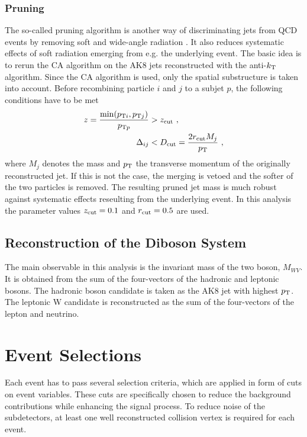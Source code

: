 \subsubsection*{Pruning}
The so-called pruning algorithm is another way of discriminating jets from QCD events by removing soft and wide-angle radiation \cite{pruning}. It also reduces systematic effects of soft radiation emerging from e.g. the underlying event. The basic idea is to rerun the CA algorithm on the AK8 jets reconstructed with the anti-$k_{\rm T}$ algorithm. Since the CA algorithm is used, only the spatial substructure is taken into account.  Before recombining particle $i$ and $j$ to a subjet $p$, the following conditions have to be met
\begin{align}
z = \frac{\min (p_{{\rm T}i},p_{{\rm T}j})}{p_{{\rm T}p}} &> z_{\rm cut} ~, \\
\Delta_{ij} &< D_{\rm cut} = \frac{2r_{\rm cut}M_j}{p_{\rm T}} ~,
\end{align}
where $M_j$ denotes the mass and $p_{\rm T}$ the transverse momentum of the originally reconstructed jet. If this is not the case, the merging is vetoed and the softer of the two particles is removed. The resulting pruned jet mass \Mpr is much robust against systematic effects reseulting from the underlying event. In this analysis the parameter values $z_{\rm cut}=0.1$ and $r_{\rm cut}=0.5$ are used.
\subsection{Reconstruction of the Diboson System}
The main observable in this analysis is the invariant mass of the two boson, $M_{WV}$. It is obtained from the sum of the four-vectors of the hadronic and leptonic bosons. The hadronic boson candidate is taken as the AK8 jet with highest $p_{\rm T}$. The leptonic W candidate is reconstructed as the sum of the four-vectors of the lepton and neutrino. 
\section{Event Selections}
\label{sec:eventselection}
Each event has to pass several selection criteria, which are applied in form of cuts on event variables. These cuts are specifically chosen to reduce the background contributions while enhancing the signal process. To reduce noise of the subdetectors, at least one well reconstructed collision vertex is required for each event.\\

